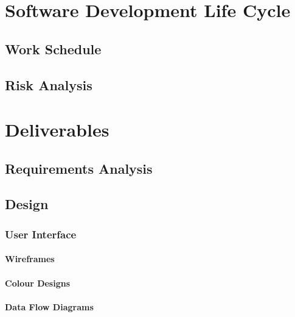 \chapter{Software Development Life Cycle}
    \section{Work Schedule}
    \label{app:gantt_chart}
    
    
    \section{Risk Analysis}
    \label{app::risk_table}
    
    
\chapter{Deliverables}
    \section{Requirements Analysis}
    \label{app::questionnaire}
    
    
    \label{app::requirements_table}
    
    
    \section{Design}
    \subsection{User Interface}
    \subsubsection{Wireframes}
    \label{app::mockups}
    
    
    \subsubsection{Colour Designs}
    \label{app:colour}
    
    
    \subsubsection{Data Flow Diagrams}
    \label{app:dfd}
    
    
